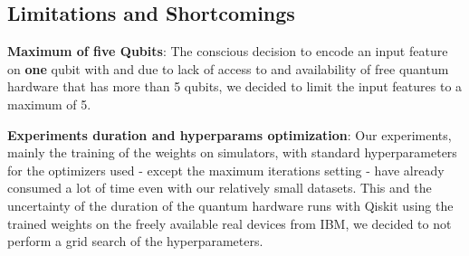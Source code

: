 \newpage

\subsection{Limitations and Shortcomings}
\label{subsection:limitations_and_shortcomings}

\textbf{Maximum of five Qubits}: The conscious decision to encode an input feature on \textbf{one} qubit with  and due to lack of access to and availability of free quantum hardware that has more than 5 qubits, we decided to limit the input features to a maximum of 5.

\textbf{Experiments duration and hyperparams optimization}: Our experiments, mainly the training of the weights on simulators, with standard hyperparameters for the optimizers used - except the maximum iterations setting - have already consumed a lot of time even with our relatively small datasets. This and the uncertainty of the duration of the quantum hardware runs with Qiskit using the trained weights on the freely available real devices from IBM, we decided to not perform a grid search of the hyperparameters.


\clearpage






